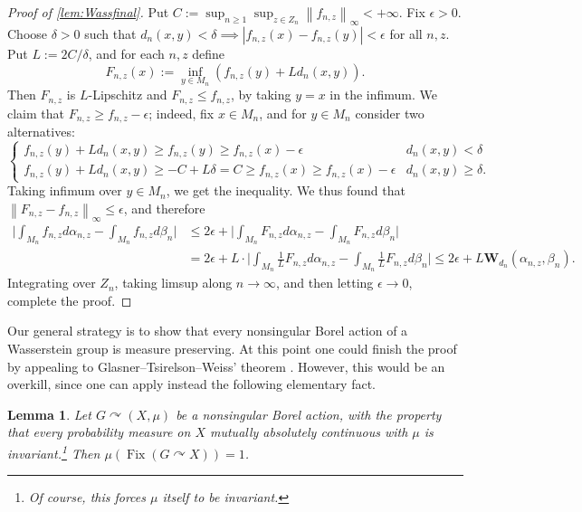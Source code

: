 \documentclass{amsart}
\providecommand{\lemmaname}{Lemma}
\numberwithin{equation}{subsection}
\theoremstyle{plain}
\newtheorem{lem}[lem]{\protect\lemmaname}
\theoremstyle{definition}
\theoremstyle{plain}
\begin{document}
\begin{proof}[Proof of \cref{lem:Wassfinal}]
Put \(C:=\sup_{n\geq 1}\sup_{z\in Z_{n}}\left\|f_{n,z}\right\|_{\infty}<+\infty\). Fix \(\epsilon>0\). Choose \(\delta>0\) such that \(d_{n}\left(x,y\right)<\delta\implies\left|f_{n,z}\left(x\right)-f_{n,z}\left(y\right)\right|<\epsilon\) for all \(n,z\). Put \(L:=2C/\delta\), and for each \(n,z\) define
\[F_{n,z}\left(x\right):=\inf_{y\in M_{n}}\left(f_{n,z}\left(y\right)+Ld_{n}\left(x,y\right)\right).\]
Then \(F_{n,z}\) is \(L\)-Lipschitz and \(F_{n,z}\leq f_{n,z}\), by taking \(y=x\) in the infimum. We claim that \(F_{n,z}\geq f_{n,z}-\epsilon\); indeed, fix \(x\in M_{n}\), and for \(y\in M_{n}\) consider two alternatives:
\[\begin{cases}
f_{n,z}\left(y\right)+Ld_{n}\left(x,y\right)\geq f_{n,z}\left(y\right)\geq f_{n,z}\left(x\right)-\epsilon
& d_{n}\left(x,y\right)<\delta\\
f_{n,z}\left(y\right)+Ld_{n}\left(x,y\right)\geq-C+L\delta=C\geq f_{n,z}\left(x\right)\geq f_{n,z}\left(x\right)-\epsilon
& d_{n}\left(x,y\right)\geq\delta.
\end{cases}\]
Taking infimum over \(y\in M_{n}\), we get the inequality. We thus found that \(\left\|F_{n,z}-f_{n,z}\right\|_{\infty}\leq\epsilon\), and therefore
\begin{align*}
\Big|\int_{M_{n}}f_{n,z}d\alpha_{n,z}-\int_{M_{n}}f_{n,z}d\beta_{n}\Big|
&\leq2\epsilon+\Big|\int_{M_{n}}F_{n,z}d\alpha_{n,z}-\int_{M_{n}}F_{n,z}d\beta_{n}\Big|\\
&=2\epsilon+L\cdot\Big|\int_{M_{n}}\frac{1}{L}F_{n,z}d\alpha_{n,z}-\int_{M_{n}}\frac{1}{L}F_{n,z}d\beta_{n}\Big|\leq2\epsilon+L\mathbf{W}_{d_{n}}\left(\alpha_{n,z},\beta_{n}\right).
\end{align*}
Integrating over \(Z_{n}\), taking limsup along \(n\to\infty\), and then letting \(\epsilon\to0\), complete the proof.
\end{proof}

Our general strategy is to show that every nonsingular Borel action of a Wasserstein group is measure preserving. At this point one could finish the proof by appealing to Glasner--Tsirelson--Weiss' theorem \cite[Thm.~1.1]{glasner2005automorphism}. However, this would be an overkill, since one can apply instead the following elementary fact.

\begin{lem}\label{lem:strange}
Let \(G\curvearrowright\left(X,\mu\right)\) be a nonsingular Borel action, with the property that every probability measure on \(X\) mutually absolutely continuous with \(\mu\) is invariant.\footnote{Of course, this forces \(\mu\) itself to be invariant.} Then \(\mu\left(\operatorname{Fix}\left(G\curvearrowright X\right)\right)=1\).
\end{lem}
\end{document}
